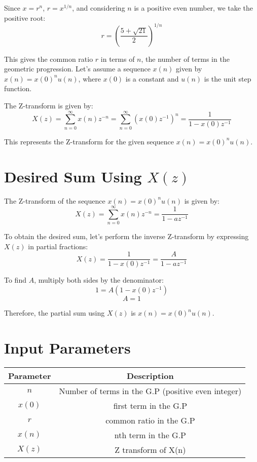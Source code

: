 \documentclass{article}
\begin{document}
Since \( x = r^n \), \( r = x^{1/n} \), and considering \( n \) is a positive even number, we take the positive root:
\[ r = \left(\frac{{5 + \sqrt{21}}}{2}\right)^{1/n} \]

This gives the common ratio \( r \) in terms of \( n \), the number of terms in the geometric progression.
Let's assume a sequence \( x(n) \) given by \( x(n) =x(0)^n u(n) \), where \( x(0) \) is a constant and \( u(n) \) is the unit step function.

The Z-transform is given by:
\[ X(z) = \sum_{n=0}^{\infty} x(n)z^{-n} = \sum_{n=0}^{\infty} (x(0)z^{-1})^n = \frac{1}{1 - x(0)z^{-1}} \]

This represents the Z-transform for the given sequence \( x(n) = x(0)^n u(n) \).

\section*{Desired Sum Using $X(z)$}
The Z-transform of the sequence \( x(n) = x(0)^n u(n) \) is given by:
\[ X(z) = \sum_{n=0}^{\infty} x(n)z^{-n} = \frac{1}{1 - az^{-1}} \]

To obtain the desired sum, let's perform the inverse Z-transform by expressing \( X(z) \) in partial fractions:
\[ X(z) = \frac{1}{1 - x(0)z^{-1}} = \frac{A}{1 - az^{-1}} \]

To find \(A\), multiply both sides by the denominator:
\[ 1 = A(1 - x(0)z^{-1}) \]
\[ A = 1 \]

Therefore, the partial sum using \(X(z)\) is \(x(n) = x(0)^n u(n)\).


\section*{Input Parameters}
\begin{center}
\begin{tabular}{|c|c|}
\hline
Parameter & Description \\
\hline
\( n \) & Number of terms in the G.P (positive even integer) \\
\hline
\(x(0) \) & first term in the G.P \\
\hline
\( r \) & common ratio in the G.P \\
\hline
\( x(n) \) & nth term in the G.P \\
\hline
\( X(z) \) & Z transform of X(n) \\
\hline
\end{tabular}
\end{center}
\end{document}
